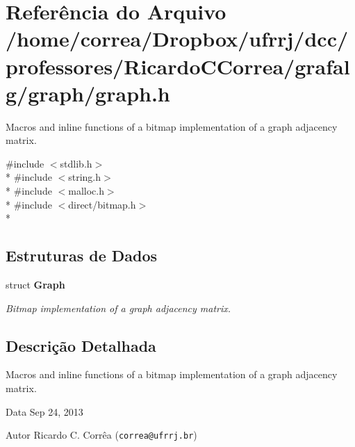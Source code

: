 \section{Referência do Arquivo /home/correa/\+Dropbox/ufrrj/dcc/professores/\+Ricardo\+C\+Correa/grafalg/graph/graph.h}
\label{graph_8h}


Macros and inline functions of a bitmap implementation of a graph adjacency matrix.  


{\ttfamily \#include $<$stdlib.\+h$>$}\\*
{\ttfamily \#include $<$string.\+h$>$}\\*
{\ttfamily \#include $<$malloc.\+h$>$}\\*
{\ttfamily \#include $<$direct/bitmap.\+h$>$}\\*
\subsection*{Estruturas de Dados}
\begin{DoxyCompactItemize}
\item 
struct {\bf Graph}
\begin{DoxyCompactList}\small\item\em Bitmap implementation of a graph adjacency matrix. \end{DoxyCompactList}\end{DoxyCompactItemize}


\subsection{Descrição Detalhada}
Macros and inline functions of a bitmap implementation of a graph adjacency matrix. 

\begin{DoxyDate}{Data}
Sep 24, 2013 
\end{DoxyDate}
\begin{DoxyAuthor}{Autor}
Ricardo C. Corrêa ({\tt correa@ufrrj.\+br}) 
\end{DoxyAuthor}
